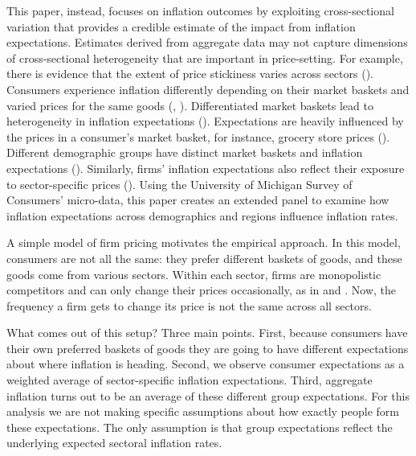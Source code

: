 \documentclass[12pt]{article}
\begin{document}
This paper, instead, focuses on inflation outcomes by exploiting cross-sectional variation that provides a credible estimate of the impact from inflation expectations.  Estimates derived from aggregate data may not capture dimensions of cross-sectional heterogeneity that are important in price-setting.  For example, there is evidence that the extent of price stickiness varies across sectors (\cite{Cravinoetal:JME2020, Boivinetal:AER2009, Almas:AER2012}).  Consumers experience inflation differently depending on their market baskets and varied prices for the same goods (\cite{KaplanWohl:JME2017}, \cite{HobijnLagakos:2005}).  Differentiated market baskets lead to heterogeneity in inflation expectations (\cite{AngelicoGiacomo:WP}).  Expectations are heavily influenced by the prices in a consumer's market basket, for instance, grocery store prices (\cite{Dacunto:groceryJPE, AngelicoGiacomo:WP}).  Different demographic groups have distinct market baskets and inflation expectations (\cite{BryanVenkatu, Dacunto:PNAS, deBruinetal:2010, DasKahnenNagel:2020}). Similarly, firms' inflation expectations also reflect their exposure to sector-specific prices (\cite{Andradeetal:JME2021}).  Using the University of Michigan Survey of Consumers' micro-data, this paper creates an extended panel to examine how inflation expectations across demographics and regions influence inflation rates.

A simple model of firm pricing motivates the empirical approach.  In this model, consumers are not all the same: they prefer different baskets of goods, and these goods come from various sectors.  Within each sector, firms are monopolistic competitors and can only change their prices occasionally, as in \cite{Calvo:JMoE1983} and \cite{WoodfordBook}.  Now, the frequency a firm gets to change its price is not the same across all sectors.

What comes out of this setup?  Three main points.  First, because consumers have their own preferred baskets of goods they are going to have different expectations about where inflation is heading.  Second, we observe consumer expectations as a weighted average of sector-specific inflation expectations.  Third, aggregate inflation turns out to be an average of these different group expectations.  For this analysis we are not making specific assumptions about how exactly people form these expectations.  The only assumption is that group expectations reflect the underlying expected sectoral inflation rates.
\end{document}
